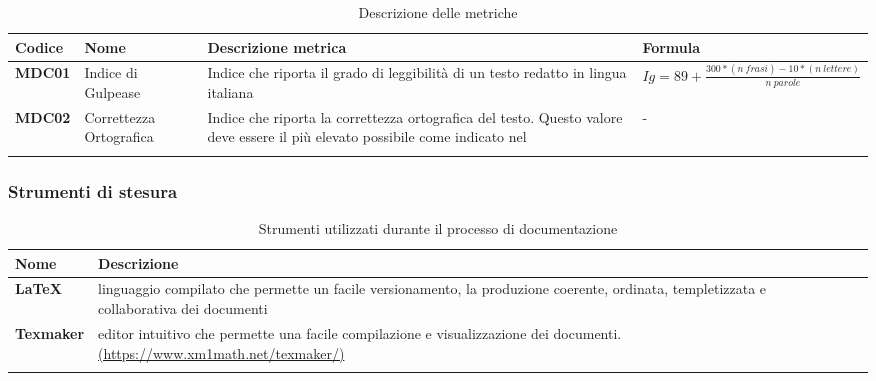 {{{
	\setlength{\freewidth}{\dimexpr\textwidth-0\tabcolsep}
	\renewcommand{\arraystretch}{1.5}
	\setlength{\aboverulesep}{0pt}
	\setlength{\belowrulesep}{0pt}
	\begin{longtable}{L{.1\freewidth} L{.15\freewidth} L{.3\freewidth} L{.35\freewidth}}
		\toprule 
		\textbf{Codice} & \textbf{Nome} & \textbf{Descrizione metrica} & \textbf{Formula}\\
		\toprule
		\endhead		
		\textbf{MDC01} & Indice di Gulpease & Indice che riporta il grado di leggibilità di un testo redatto in lingua italiana & \small{$Ig= 89 + \frac{300 * (n\ frasi) - 10 * (n\ lettere)}{n\ parole}$} \\
		\textbf{MDC02} & Correttezza Ortografica & Indice che riporta la correttezza ortografica del testo. Questo valore deve essere il più elevato possibile come indicato nel \PdQ{} & - \\
		
		\bottomrule
		\hiderowcolors
		\caption{Descrizione delle metriche}\\
	\end{longtable}
}


\subsubsection{Strumenti di stesura}

	\setlength{\freewidth}{\dimexpr\textwidth-1\tabcolsep}
	\renewcommand{\arraystretch}{1.5}
	\setlength{\aboverulesep}{0pt}
	\setlength{\belowrulesep}{0pt}
	\begin{longtable}{L{.210\freewidth} L{.75\freewidth} L{.080\freewidth}}
		\toprule 
		\textbf{Nome} & \textbf{Descrizione} \\
		\toprule
		\endhead		
		\textbf{\LaTeX} & linguaggio compilato che permette un facile versionamento, la produzione coerente, ordinata, templetizzata e collaborativa dei documenti \\
		\textbf{Texmaker} & editor intuitivo che permette una facile compilazione e visualizzazione dei documenti. \newline \url{(https://www.xm1math.net/texmaker/)}\\
		\bottomrule
		\hiderowcolors
		\caption{Strumenti utilizzati durante il processo di documentazione}
	\end{longtable}

}}
